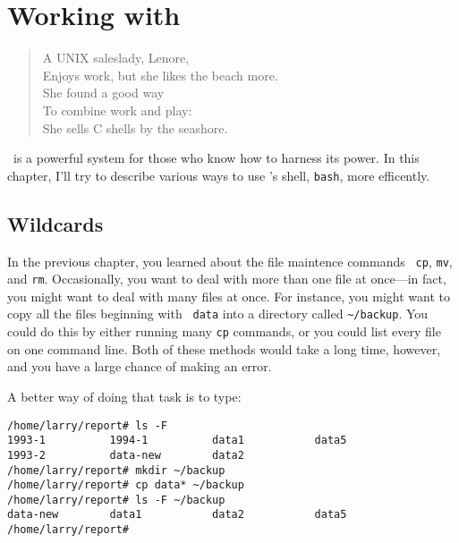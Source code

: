 \chapter{Working with \unix}\label{shell2-chapter}


\begin{fortune}
\begin{verse}
A UNIX saleslady, Lenore,\\
Enjoys work, but she likes the beach more.\\
\hspace{0.5in}She found a good way\\
\hspace{0.5in}To combine work and play:\\
She sells C shells by the seashore.
\end{verse}
\end{fortune}


\unix\ is a powerful system for those who know how to harness its
power.  In this chapter, I'll try to describe various ways to use
\unix's shell, {\tt bash}, more efficently.

\section{Wildcards}

In the previous chapter, you learned about the file maintence commands {\tt
cp}, {\tt mv}, and {\tt rm}.  Occasionally, you want to deal with more than
one file at once---in fact, you might want to deal with many files at once.
For instance, you might want to copy all the files beginning with {\tt
data} into a directory called {\tt \verb+~+/backup}.  You could do this by either
running many {\tt cp} commands, or you could list every file on one command
line. Both of these methods would take a long time, however, and you have a
large chance of making an error.

A better way of doing that task is to type:
\begin{screen}\begin{verbatim}
/home/larry/report# ls -F
1993-1          1994-1          data1           data5
1993-2          data-new        data2
/home/larry/report# mkdir ~/backup
/home/larry/report# cp data* ~/backup
/home/larry/report# ls -F ~/backup
data-new        data1           data2           data5
/home/larry/report#
\end{verbatim}\end{screen}

